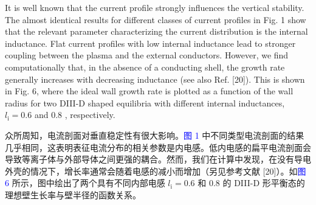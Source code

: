 \documentclass[utf8]{ctexart}
\newcommand\enzhbox[2]{
  	\quad\par \begin{paracol}{2} \colseprulecolor{black} 
  		\begin{spacing}{1.0}
  			\footnotesize  #1
  		\end{spacing}
  		\switchcolumn[1] 
  		#2
  	\end{paracol} \quad\par
  }
\begin{document}
\begin{sloppypar}
\enzhbox{  It is well known that the current profile strongly influences the vertical stability. The almost identical results for different classes of current profiles in Fig. 1 show that the relevant parameter characterizing the current distribution is the internal inductance. Flat current profiles with low internal inductance lead to stronger coupling between the plasma and the external conductors. However, we find computationally that, in the absence of a conducting shell, the growth rate generally increases with decreasing inductance (see also Ref. \textcolor{green!50!black}{[20]}). This is shown in Fig. 6, where the ideal wall growth rate is plotted as a function of the wall radius for two DIII-D shaped equilibria with different internal inductances, $l_{\mathrm{i}}=0.6$ and 0.8 , respectively.}{
众所周知，电流剖面对垂直稳定性有很大影响。\textcolor{blue}{图 1} 中不同类型电流剖面的结果几乎相同，这表明表征电流分布的相关参数是内电感。低内电感的扁平电流剖面会导致等离子体与外部导体之间更强的耦合。然而，我们在计算中发现，在没有导电外壳的情况下，增长率通常会随着电感的减小而增加（另见参考文献 \textcolor{green!50!black}{[20]}）。如\textcolor{blue}{图 6} 所示，图中绘出了两个具有不同内部电感 $l_{\mathrm{i}}=0.6$  和 0.8 的 DIII-D 形平衡态的理想壁生长率与壁半径的函数关系。}
  

\end{sloppypar}
\end{document}
